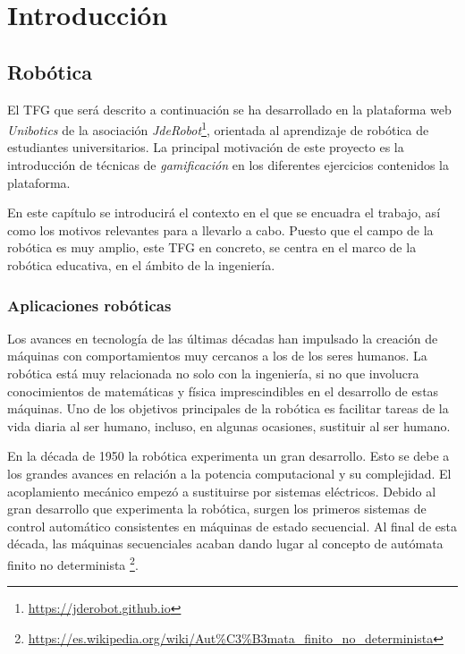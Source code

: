 \documentclass[a4paper, 12pt]{book}
\begin{document}

\cleardoublepage
\chapter{Introducción}
\label{sec:intro} %

\section{Robótica}
\label{sec:robotica}

El TFG que será descrito a continuación se ha desarrollado en la plataforma web \textit{Unibotics} de la asociación \textit{JdeRobot}\footnote{\url{https://jderobot.github.io}}, orientada al aprendizaje de robótica de estudiantes universitarios. La principal motivación de este proyecto es la introducción de técnicas de \emph{gamificación} en los diferentes ejercicios contenidos la plataforma.

En este capítulo se introducirá el contexto en el que se encuadra el trabajo, así como los motivos relevantes para a llevarlo a cabo. Puesto que el campo de la robótica es muy amplio, este TFG en concreto, se centra en el marco de la robótica educativa, en el ámbito de la ingeniería.

\subsection{Aplicaciones robóticas}
\label{sec:apps_roboticas}


Los avances en tecnología de las últimas décadas han impulsado la creación de máquinas con comportamientos muy cercanos a los de los seres humanos. La robótica está muy relacionada no solo con la ingeniería, si no que involucra conocimientos de matemáticas y física imprescindibles en el desarrollo de estas máquinas. Uno de los objetivos principales de la robótica es facilitar tareas de la vida diaria al ser humano, incluso, en algunas ocasiones, sustituir al ser humano.

En la década de 1950 la robótica experimenta un gran desarrollo. Esto se debe a los grandes avances en relación a la potencia computacional y su complejidad. El acoplamiento mecánico empezó a sustituirse por sistemas eléctricos. Debido al gran desarrollo que experimenta la robótica, surgen los primeros sistemas de control automático consistentes en máquinas de estado secuencial. Al final de esta década, las máquinas secuenciales acaban dando lugar al concepto de autómata finito no determinista \footnote{\url{https://es.wikipedia.org/wiki/Aut\%C3\%B3mata_finito_no_determinista}}.
\end{document}
